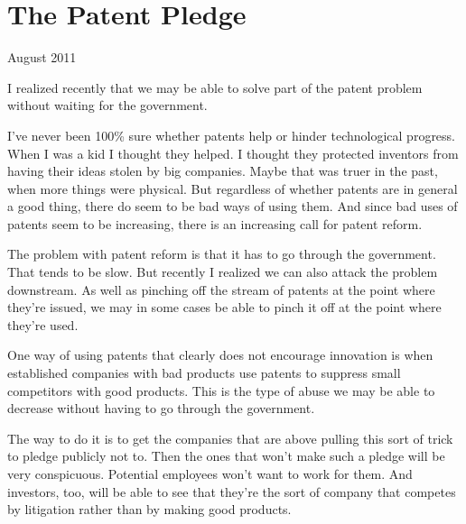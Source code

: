 \chapter{The Patent Pledge}


            
              
                

August 2011

I realized recently that we may be
                  able to solve part of the patent problem without waiting for
                  the government.

I've never been 100\% sure whether
                  patents help or hinder technological progress. When I was a
                  kid I thought they helped. I thought they protected inventors
                  from having their ideas stolen by big companies. Maybe that
                  was truer in the past, when more things were physical. But
                  regardless of whether patents are in general a good thing,
                  there do seem to be bad ways of using them. And since bad uses
                  of patents seem to be increasing, there is an increasing call
                  for patent reform.

The problem with patent reform
                  is that it has to go through the government. That tends to be
                  slow. But recently I realized we can also attack the problem
                  downstream. As well as pinching off the stream of patents at
                  the point where they're issued, we may in some cases be able
                  to pinch it off at the point where they're used.

One
                  way of using patents that clearly does not encourage
                  innovation is when established companies with bad products use
                  patents to suppress small competitors with good products. This
                  is the type of abuse we may be able to decrease without having
                  to go through the government.

The way to do it is
                  to get the companies that are above pulling this sort of trick
                  to pledge publicly not to. Then the ones that won't make such
                  a pledge will be very conspicuous. Potential employees won't
                  want to work for them. And investors, too, will be able to see
                  that they're the sort of company that competes by litigation
                  rather than by making good products.

